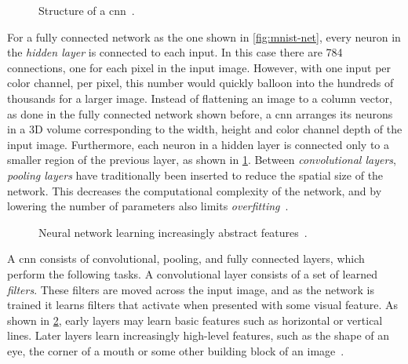 \documentclass[\rootfolder/main.tex]{subfiles}
\begin{document}
\begin{figure}
    \caption[Structure of a \acrfull{cnn}.]{Structure of a \acrfull{cnn}~\cite{Mathworks}.}
    \label{fig:cnn-classification}
\end{figure}

For a fully connected network as the one shown in \cref{fig:mnist-net}, every neuron in the \emph{hidden layer} is connected to each input.
In this case there are 784 connections, one for each pixel in the input image.
However, with one input per color channel, per pixel, this number would quickly balloon into the hundreds of thousands for a larger image.
Instead of flattening an image to a column vector, as done in the fully connected network shown before, a \acrshort{cnn} arranges its neurons in a 3D volume corresponding to the width, height and color channel depth of the input image.
Furthermore, each neuron in a hidden layer is connected only to a smaller region of the previous layer, as shown in \cref{fig:cnn-classification}.
Between \emph{convolutional layers}, \emph{pooling layers} have traditionally been inserted to reduce the spatial size of the network.
This decreases the computational complexity of the network, and by lowering the number of parameters also limits \emph{overfitting}~\cite{Szegedy2014}.

\begin{figure}
    \caption[Neural network learning increasingly abstract features.]%
            {Neural network learning increasingly abstract features~\cite{Brown2015}.}
    \label{fig:abstract-features}
\end{figure}

A \acrshort{cnn} consists of convolutional, pooling, and fully connected layers, which perform the following tasks.
A convolutional layer consists of a set of learned \emph{filters}.
These filters are moved across the input image, and as the network is trained it learns filters that activate when presented with some visual feature.
As shown in \cref{fig:abstract-features}, early layers may learn basic features such as horizontal or vertical lines.
Later layers learn increasingly high-level features, such as the shape of an eye, the corner of a mouth or some other building block of an image~\cite{Brown2015}.

\end{document}
